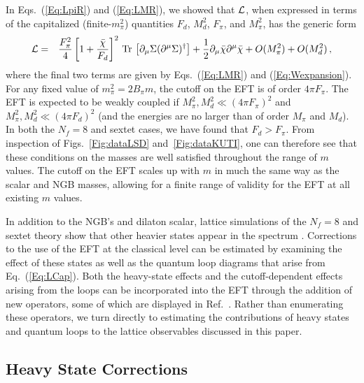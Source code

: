 \documentclass[a4paper,11pt]{article}
\newcommand{\beqs}{\begin{eqnarray}}
\newcommand{\eeqs}{\end{eqnarray}}
\newcommand{\Tr}{{\rm Tr}}
\def\Tr{{\rm Tr \,}}                                    %
\begin{document}
In Eqs.~(\ref{Eq:LpiR}) and (\ref{Eq:LMR}), 
we showed that $\cal{L}$, when expressed in terms of the capitalized (finite-$m_{\pi}^2$) quantities  $F_d$, $M_d^2$, $F_{\pi}$, and $M_{\pi}^2$, has the generic form 
\beqs
{\cal L}&=&\frac{F_{\pi}^2}{4}\left[ 1+ \frac{\bar{\chi}}{F_{d}}\right]^2 \,\Tr\left[\partial_\mu \Sigma (\partial^{\mu} \Sigma)^{\dagger}\right] + \frac{1}{2} \partial_\mu \bar{\chi} \partial^{\mu} \bar{\chi} + O(M_{\pi}^2) + O(M_{d}^2)\,,
\label{Eq:LCap}
\eeqs
where the final two terms are given by Eqs.~(\ref{Eq:LMR}) and (\ref{Eq:Wexpansion}). For any fixed value of $m_{\pi}^2 = 2 B_{\pi} m$, the cutoff on the EFT is of order $4 \pi F_{\pi}$. The EFT is expected to be weakly coupled if $M_{\pi}^2, M^2_d \ll (4 \pi F_{\pi})^2$ and $M_{\pi}^2, M^2_d \ll (4 \pi F_d)^2$ (and the energies are no larger than of order $M_{\pi} $ and $M_d$). In both the $N_f=8$ and sextet cases, we have found that $F_d>F_\pi$. From  inspection of Figs.~\ref{Fig:dataLSD} and~\ref{Fig:dataKUTI}, one can therefore see that these conditions on the masses are well satisfied throughout the range of $m$ values. The cutoff on the EFT scales up with $m$ in much the same way as the scalar and NGB masses, allowing for a finite range of validity for the EFT at all existing $m$ values.

In addition to the NGB's and dilaton scalar, lattice simulations of the $N_f=8$ and sextet theory show that other heavier states appear in the spectrum \cite{LSD,FHKMNW2}. Corrections to the use of the EFT at the classical level can be estimated by examining the effect of these states as well as the quantum loop diagrams that arise from Eq.~(\ref{Eq:LCap}). Both the heavy-state effects and the cutoff-dependent effects arising from the loops can be incorporated into the EFT through the addition of new operators, some of which are displayed in Ref.~\cite{EFTDilaton1}. Rather than enumerating these operators, we turn directly to estimating the contributions of heavy states and quantum loops to the lattice observables discussed in this paper.



\subsection{Heavy State Corrections}
\end{document}

